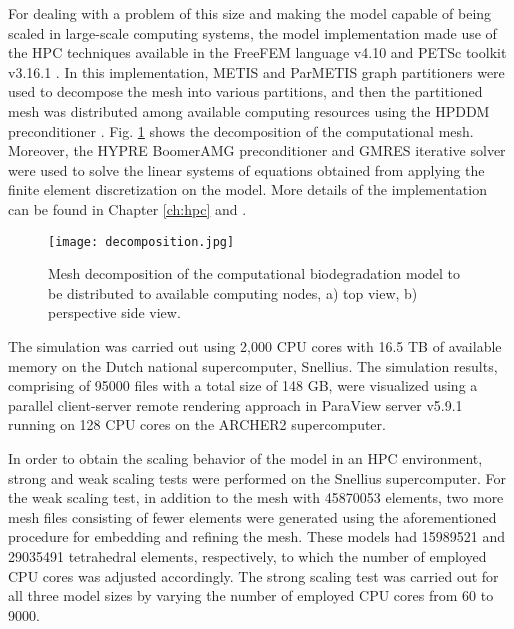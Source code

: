 For dealing with a problem of this size and making the model capable of being scaled in large-scale computing systems, the model implementation made use of the \gls{HPC} techniques available in the FreeFEM language v4.10 and \gls{PETSc} toolkit v3.16.1 \cite{petsc}. In this implementation, METIS and ParMETIS graph partitioners \cite{METIS1998} were used to decompose the mesh into various partitions, and then the partitioned mesh was distributed among available computing resources using the \gls{HPDDM} preconditioner \cite{Jolivet2013}. Fig. \ref{fig:cup_decomposition} shows the decomposition of the computational mesh. Moreover, the HYPRE BoomerAMG \cite{Falgout2002} preconditioner and \gls{GMRES} iterative solver \cite{Saad1986} were used to solve the linear systems of equations obtained from applying the finite element discretization on the model. More details of the implementation can be found in Chapter \ref{ch:hpc} and \cite{Barzegari2022}.

\begin{figure}[h]
\centering
\medskip
\texttt{[image: decomposition.jpg]}
\caption[Mesh decomposition of the acetabular implant model]{Mesh decomposition of the computational biodegradation model to be distributed to available computing nodes, a) top view, b) perspective side view. } \label{fig:cup_decomposition}
\end{figure}

The simulation was carried out using 2,000 \gls{CPU} cores with 16.5 TB of available memory on the Dutch national supercomputer, Snellius. The simulation results, comprising of \num{95000} files with a total size of 148 GB, were visualized using a parallel client-server remote rendering approach in ParaView server v5.9.1 running on 128 \gls{CPU} cores on the ARCHER2 supercomputer.

In order to obtain the scaling behavior of the model in an \gls{HPC} environment, strong and weak scaling tests were performed on the Snellius supercomputer. For the weak scaling test, in addition to the mesh with \num{45870053} elements, two more mesh files consisting of fewer elements were generated using the aforementioned procedure for embedding and refining the mesh. These models had \num{15989521} and \num{29035491} tetrahedral elements, respectively, to which the number of employed \gls{CPU} cores was adjusted accordingly. The strong scaling test was carried out for all three model sizes by varying the number of employed \gls{CPU} cores from 60 to \num{9000}.


